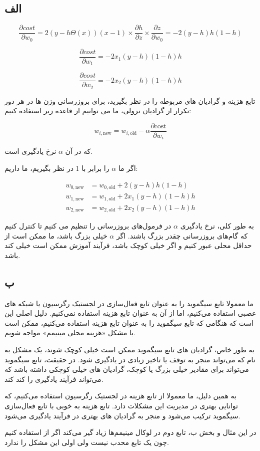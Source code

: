 \subsection*{الف}

$$
\frac{\partial cost}{\partial w_0} = 2 (y - h \Theta (x)) (x - 1) \times  \frac{\partial h}{\partial z} \times \frac{\partial z}{\partial w_0} = -2 (y - h) h (1 - h)
$$

$$
\frac{\partial cost}{\partial w_1} = -2 x_1 (y - h) (1 - h) h
$$

$$
\frac{\partial cost}{\partial w_2} = -2 x_2 (y - h) (1 - h) h
$$

تابع هزینه و گرادیان های مربوطه را در نظر بگیرید، برای بروزرسانی وزن ها در هر دور تکرار از گرادیان نزولی، ما می توانیم از قاعده زیر استفاده کنیم:

$$
w_{i,\text{{new}}} = w_{i,\text{{old}}} - \alpha \frac{\partial \text{{cost}}}{\partial w_i}
$$

که در آن 
$\alpha$
نرخ یادگیری است.

اگر ما 
$\alpha$
را برابر با 1 در نظر بگیریم، ما داریم:

\begin{align}
	w_{0,\text{{new}}} &= w_{0,\text{{old}}} + 2 (y - h) h (1 - h) \\
	w_{1,\text{{new}}} &= w_{1,\text{{old}}} + 2 x_1 (y - h) (1 - h) h \\
	w_{2,\text{{new}}} &= w_{2,\text{{old}}} + 2 x_2 (y - h) (1 - h) h
\end{align}

به طور کلی، نرخ یادگیری 
$\alpha$
در فرمول‌های بروزرسانی را تنظیم می کنیم تا کنترل کنیم که گام‌های بروزرسانی چقدر بزرگ باشند. اگر 
$\alpha$
خیلی بزرگ باشد، ما ممکن است از حداقل محلی عبور کنیم و اگر خیلی کوچک باشد، فرآیند آموزش ممکن است خیلی کند باشد.

\subsection*{ب}

ما معمولا تابع سیگموید را به عنوان تابع فعال‌سازی در لجستیک رگرسیون یا شبکه های عصبی استفاده می‌کنیم، اما از آن به عنوان تابع هزینه استفاده نمی‌کنیم. دلیل اصلی این است که هنگامی که تابع سیگموید را به عنوان تابع هزینه استفاده می‌کنیم، ممکن است با مشکل «هزینه محلی مینیمم» 
مواجه شویم.

به طور خاص، گرادیان های تابع سیگموید ممکن است خیلی کوچک شوند، یک مشکل به نام 
که می‌تواند منجر به توقف یا تاخیر زیادی در یادگیری شود. در حقیقت، تابع سیگموید می‌تواند برای مقادیر خیلی بزرگ یا کوچک، گرادیان های خیلی کوچکی داشته باشد که می‌تواند فرآیند یادگیری را کند کند.

به همین دلیل، ما معمولا از تابع هزینه 
در لجستیک رگرسیون استفاده می‌کنیم، که توانایی بهتری در مدیریت این مشکلات دارد. تابع هزینه
به خوبی با تابع فعال‌سازی سیگموید ترکیب می‌شود و منجر به گرادیان های بهتری در فرآیند یادگیری می‌شود.

در این مثال و بخش ب، تابع دوم در لوکال مینیمم‌ها زیاد گیر می‌کند اگر از
استفاده کنیم چون یک تابع محدب نیست ولی اولی این مشکل را ندارد.